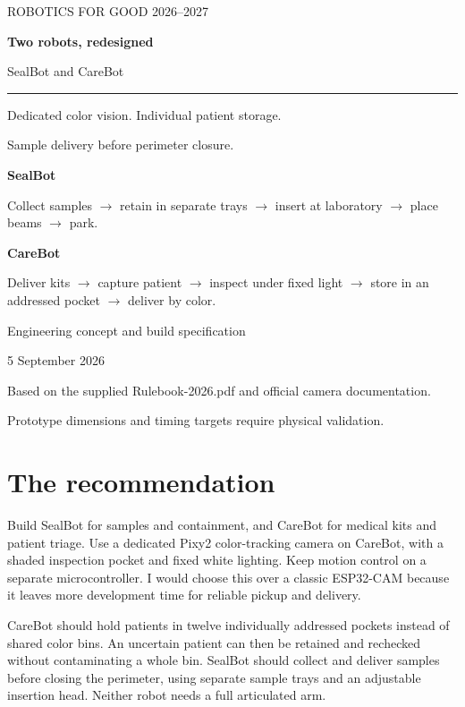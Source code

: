 \documentclass[10pt,a4paper]{article}
\begin{document}
\begin{titlepage}
\color{ink}
\vspace*{20mm}
{\large ROBOTICS FOR GOOD 2026--2027\par}
\vspace{9mm}
{\Huge\bfseries Two robots, redesigned\par}
\vspace{7mm}
{\Large SealBot and CareBot\par}
\vspace{12mm}
\rule{\linewidth}{1pt}
\vspace{8mm}
{\large Dedicated color vision. Individual patient storage.\par}
{\large Sample delivery before perimeter closure.\par}
\vspace{12mm}
\textbf{SealBot}\par
Collect samples $\rightarrow$ retain in separate trays $\rightarrow$ insert at laboratory
$\rightarrow$ place beams $\rightarrow$ park.\par
\vspace{6mm}
\textbf{CareBot}\par
Deliver kits $\rightarrow$ capture patient $\rightarrow$ inspect under fixed light
$\rightarrow$ store in an addressed pocket $\rightarrow$ deliver by color.\par
\vfill
\color{black}
Engineering concept and build specification\par
5 September 2026\par
Based on the supplied Rulebook-2026.pdf and official camera documentation.\par
Prototype dimensions and timing targets require physical validation.
\end{titlepage}
\tableofcontents
\clearpage
{}\section{The recommendation}
Build SealBot for samples and containment, and CareBot for medical kits and patient triage. Use a dedicated Pixy2 color-tracking camera on CareBot, with a shaded inspection pocket and fixed white lighting. Keep motion control on a separate microcontroller. I would choose this over a classic ESP32-CAM because it leaves more development time for reliable pickup and delivery.

CareBot should hold patients in twelve individually addressed pockets instead of shared color bins. An uncertain patient can then be retained and rechecked without contaminating a whole bin. SealBot should collect and deliver samples before closing the perimeter, using separate sample trays and an adjustable insertion head. Neither robot needs a full articulated arm.
\end{document}
